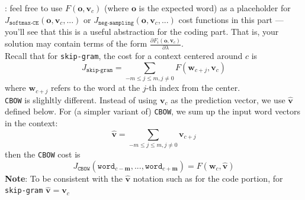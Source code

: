 \documentclass[letter,12pt]{article}
\begin{document}
: feel free to use $F({\boldsymbol o}, {\boldsymbol v}_{c})$ (where ${\boldsymbol o}$ is the expected word) as a placeholder for $J_{\texttt{softmax-CE}}({\boldsymbol o}, {\boldsymbol v}_{c}, ...)$ or $J_{\texttt{neg-sampling}}({\boldsymbol o}, {\boldsymbol v}_{c}, ...)$ cost functions in this part --- you'll see that this is a useful abstraction for the coding part. That is, your solution may contain terms of the form $\frac{\partial{F_{i}({\boldsymbol o}, {\boldsymbol v}_{c})}}{\partial\lambda}$.\\

\noindent Recall that for \texttt{skip-gram}, the cost for a context centered around $c$ is
\begin{equation}
J_{\texttt{skip-gram}} =   \sum_{-m\le j\le m, j\neq0}F({\boldsymbol w}_{c+j}, {\boldsymbol v}_{c})
\end{equation}
where ${\boldsymbol w}_{c+j}$ refers to the word at the $j$-th index from the center.\\

\noindent \texttt{CBOW} is slighltly different. Instead of using ${\boldsymbol v}_{c}$ as the prediction vector, we use $\hat{\boldsymbol v}$ defined below. For (a simpler variant of) \texttt{CBOW}, we sum up the input word vectors in the context:\\
\begin{equation}
\hat{\boldsymbol v} = \sum_{-m\le j\le m, j\neq0}{\boldsymbol v}_{c+j}
\end{equation}
then the \texttt{CBOW} cost is 
\begin{equation}
J_{\texttt{CBOW}}(\texttt{word}_{c-\textbf{m}} ,...,\texttt{word}_{c+\textbf{m}}) = F({\boldsymbol w}_{c}, \hat{\boldsymbol v})
\end{equation}
\noindent\textbf{Note}: To be consistent with the $\hat{\boldsymbol v}$ notation such as for the code portion, for \texttt{skip-gram} $\hat{\boldsymbol v} = {\boldsymbol v_{c}}$

%
\end{document}
